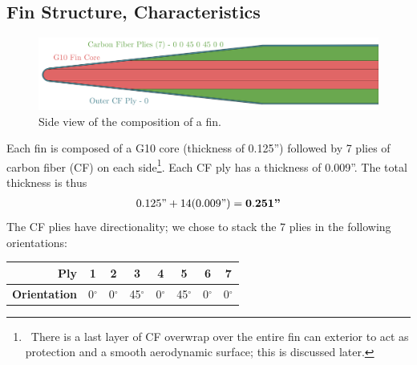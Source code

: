 \documentclass{amsdtx}
\begin{document}
\subsection{Fin Structure, Characteristics}
\begin{figure}[H]
\centering
\includegraphics[scale=0.05]{finStruct.pdf}
\caption{Side view of the composition of a fin.}	
\end{figure}
Each fin is composed of a G10 core (thickness of 0.125'') followed by 7 plies of carbon fiber (CF) on each side\footnote{~There is a last layer of CF overwrap over the entire fin can exterior to act as protection and a smooth aerodynamic surface; this is discussed later.}. Each CF ply has a thickness of 0.009''. The total thickness is thus
\begin{align}
	0.125\text{''} + 14(0.009\text{''}) = \bf{0.251\text{\bf ''}}
\end{align}
The CF plies have directionality; we chose to stack the 7 plies in the following orientations:
\begin{table}[H]
\centering
\renewcommand{\arraystretch}{1.4}
\begin{tabular}{r|c|c|c|c|c|c|c}
\bf Ply & 1 & 2 & 3 & 4 & 5 & 6 & 7\\\hline
\bf Orientation & 0$^\circ$ & 0$^\circ$ & 45$^\circ$ & 0$^\circ$ & 45$^\circ$ & 0$^\circ$ & 0$^\circ$
\end{tabular}
\end{table}
\end{document}
